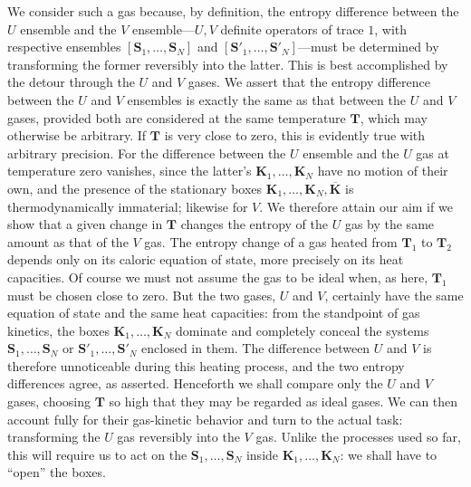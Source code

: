 \documentclass[fontsize=13pt,twoside,openany,headings=normal,parskip=false,bookmarkpackage=false,DIV=calc]{scrbook}
\begin{document}
We consider such a gas because, by definition, the entropy difference between the $U$ ensemble and the $V$ ensemble---$U,V$ definite operators of trace $1$, with respective ensembles $[\boldsymbol{S}_1,\ldots,\boldsymbol{S}_N]$ and $[\boldsymbol{S}'_1,\ldots,\boldsymbol{S}'_N]$---must be determined by transforming the former reversibly into the latter. This is best accomplished by the detour through the $U$ and $V$ gases. We assert that the entropy difference between the $U$ and $V$ ensembles is exactly the same as that between the $U$ and $V$ gases, provided both are considered at the same temperature $\mathbf T$, which may otherwise be arbitrary. If $\mathbf T$ is very close to zero, this is evidently true with arbitrary precision. For the difference between the $U$ ensemble and the $U$ gas at temperature zero vanishes, since the latter's $\boldsymbol{K}_1,\ldots,\boldsymbol{K}_N$ have no motion of their own, and the presence of the stationary boxes $\boldsymbol{K}_1,\ldots,\boldsymbol{K}_N,\overline{\boldsymbol{K}}$ is thermodynamically immaterial; likewise for $V$. We therefore attain our aim if we show that a given change in $\mathbf T$ changes the entropy of the $U$ gas by the same amount as that of the $V$ gas. The entropy change of a gas heated from $\mathbf T_1$ to $\mathbf T_2$ depends only on its caloric equation of state, more precisely on its heat capacities. Of course we must not assume the gas to be ideal when, as here, $\mathbf T_1$ must be chosen close to zero. But the two gases, $U$ and $V$, certainly have the same equation of state and the same heat capacities: from the standpoint of gas kinetics, the boxes $\boldsymbol{K}_1,\ldots,\boldsymbol{K}_N$ dominate and completely conceal the systems $\boldsymbol{S}_1,\ldots,\boldsymbol{S}_N$ or $\boldsymbol{S}'_1,\ldots,\boldsymbol{S}'_N$ enclosed in them. The difference between $U$ and $V$ is therefore unnoticeable during this heating process, and the two entropy differences agree, as asserted. Henceforth
\hypertarget{origpage-194}{}%
we shall compare only the $U$ and $V$ gases, choosing $\mathbf T$ so high that they may be regarded as ideal gases. We can then account fully for their gas-kinetic behavior and turn to the actual task: transforming the $U$ gas reversibly into the $V$ gas. Unlike the processes used so far, this will require us to act on the $\boldsymbol{S}_1,\ldots,\boldsymbol{S}_N$ inside $\boldsymbol{K}_1,\ldots,\boldsymbol{K}_N$: we shall have to ``open'' the boxes.
\end{document}
